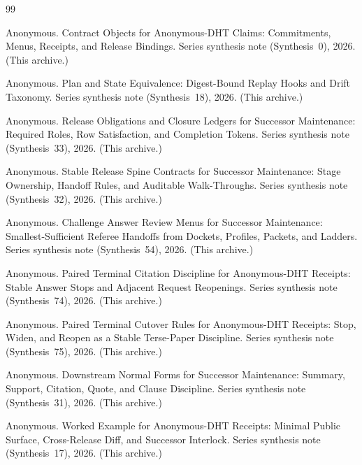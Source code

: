 \documentclass[11pt]{article}
\begin{document}
\begin{thebibliography}{99}\small

Anonymous.
\newblock Contract Objects for Anonymous-DHT Claims: Commitments, Menus, Receipts, and Release Bindings.
\newblock Series synthesis note (Synthesis~0), 2026. (This archive.)

Anonymous.
\newblock Plan and State Equivalence: Digest-Bound Replay Hooks and Drift Taxonomy.
\newblock Series synthesis note (Synthesis~18), 2026. (This archive.)

Anonymous.
\newblock Release Obligations and Closure Ledgers for Successor Maintenance: Required Roles, Row Satisfaction, and Completion Tokens.
\newblock Series synthesis note (Synthesis~33), 2026. (This archive.)

Anonymous.
\newblock Stable Release Spine Contracts for Successor Maintenance: Stage Ownership, Handoff Rules, and Auditable Walk-Throughs.
\newblock Series synthesis note (Synthesis~32), 2026. (This archive.)

Anonymous.
\newblock Challenge Answer Review Menus for Successor Maintenance: Smallest-Sufficient Referee Handoffs from Dockets, Profiles, Packets, and Ladders.
\newblock Series synthesis note (Synthesis~54), 2026. (This archive.)

Anonymous.
\newblock Paired Terminal Citation Discipline for Anonymous-DHT Receipts: Stable Answer Stops and Adjacent Request Reopenings.
\newblock Series synthesis note (Synthesis~74), 2026. (This archive.)

Anonymous.
\newblock Paired Terminal Cutover Rules for Anonymous-DHT Receipts: Stop, Widen, and Reopen as a Stable Terse-Paper Discipline.
\newblock Series synthesis note (Synthesis~75), 2026. (This archive.)

Anonymous.
\newblock Downstream Normal Forms for Successor Maintenance: Summary, Support, Citation, Quote, and Clause Discipline.
\newblock Series synthesis note (Synthesis~31), 2026. (This archive.)

Anonymous.
\newblock Worked Example for Anonymous-DHT Receipts: Minimal Public Surface, Cross-Release Diff, and Successor Interlock.
\newblock Series synthesis note (Synthesis~17), 2026. (This archive.)

\end{thebibliography}
\end{document}
